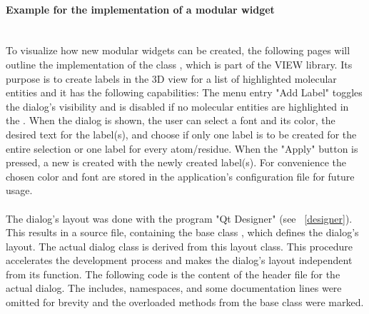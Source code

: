 

\paragraph{Example for the implementation of a modular widget}
\hspace*{\fill}\\
To visualize how new modular widgets can be created, the following pages will outline 
the implementation of the class , which is
part of the VIEW library. 
Its purpose is to create labels in the 3D view for a list of 
highlighted molecular entities and it has the following capabilities:
The menu entry {"Add Label"} toggles the dialog's visibility and is 
disabled if no molecular entities are highlighted in the .
When the dialog is shown, the user can select a font and its color, the desired text for 
the label(s), and choose if only one label is to be created for the entire selection or 
one label for every atom/residue.  
When the "Apply" button is pressed, a new  is created with the newly 
created label(s).
For convenience the chosen color and font are stored in the application's configuration 
file for future usage.
\\ 
\\
The dialog's layout was done with the program "Qt Designer" (see ~\ref{designer}).
This results in a source file, containing the base class , which 
defines the dialog's layout. The actual dialog class is derived from this layout class.
This procedure accelerates the development process and makes the dialog's 
layout independent from its function.
The following code is the content of the header file for the actual dialog.
The includes, namespaces, and some documentation lines were omitted for brevity and the
overloaded methods from the  base class were marked.
